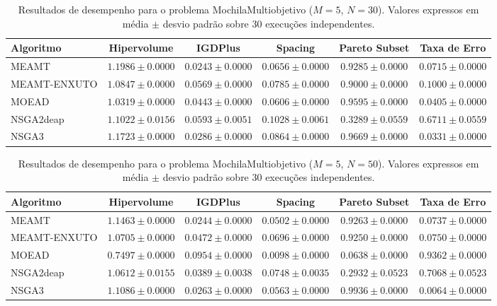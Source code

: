 \begin{table}[htpb]
\centering
\caption{Resultados de desempenho para o problema MochilaMultiobjetivo ($M=5$, $N=30$). Valores expressos em média $\pm$ desvio padrão sobre 30 execuções independentes.}
\label{tab:MochilaMultiobjetivo_M5_N30}
\begin{tabular}{lccccc}
\hline\hline
Algoritmo & Hipervolume & IGDPlus & Spacing & Pareto Subset & Taxa de Erro \\
\hline
MEAMT & $1.1986 \pm 0.0000$ & $0.0243 \pm 0.0000$ & $0.0656 \pm 0.0000$ & $0.9285 \pm 0.0000$ & $0.0715 \pm 0.0000$ \\
MEAMT-ENXUTO & $1.0847 \pm 0.0000$ & $0.0569 \pm 0.0000$ & $0.0785 \pm 0.0000$ & $0.9000 \pm 0.0000$ & $0.1000 \pm 0.0000$ \\
MOEAD & $1.0319 \pm 0.0000$ & $0.0443 \pm 0.0000$ & $0.0606 \pm 0.0000$ & $0.9595 \pm 0.0000$ & $0.0405 \pm 0.0000$ \\
NSGA2deap & $1.1022 \pm 0.0156$ & $0.0593 \pm 0.0051$ & $0.1028 \pm 0.0061$ & $0.3289 \pm 0.0559$ & $0.6711 \pm 0.0559$ \\
NSGA3 & $1.1723 \pm 0.0000$ & $0.0286 \pm 0.0000$ & $0.0864 \pm 0.0000$ & $0.9669 \pm 0.0000$ & $0.0331 \pm 0.0000$ \\
\hline\hline
\end{tabular}
\end{table}

\begin{table}[htpb]
\centering
\caption{Resultados de desempenho para o problema MochilaMultiobjetivo ($M=5$, $N=50$). Valores expressos em média $\pm$ desvio padrão sobre 30 execuções independentes.}
\label{tab:MochilaMultiobjetivo_M5_N50}
\begin{tabular}{lccccc}
\hline\hline
Algoritmo & Hipervolume & IGDPlus & Spacing & Pareto Subset & Taxa de Erro \\
\hline
MEAMT & $1.1463 \pm 0.0000$ & $0.0244 \pm 0.0000$ & $0.0502 \pm 0.0000$ & $0.9263 \pm 0.0000$ & $0.0737 \pm 0.0000$ \\
MEAMT-ENXUTO & $1.0705 \pm 0.0000$ & $0.0472 \pm 0.0000$ & $0.0696 \pm 0.0000$ & $0.9250 \pm 0.0000$ & $0.0750 \pm 0.0000$ \\
MOEAD & $0.7497 \pm 0.0000$ & $0.0954 \pm 0.0000$ & $0.0098 \pm 0.0000$ & $0.0638 \pm 0.0000$ & $0.9362 \pm 0.0000$ \\
NSGA2deap & $1.0612 \pm 0.0155$ & $0.0389 \pm 0.0038$ & $0.0748 \pm 0.0035$ & $0.2932 \pm 0.0523$ & $0.7068 \pm 0.0523$ \\
NSGA3 & $1.1086 \pm 0.0000$ & $0.0263 \pm 0.0000$ & $0.0563 \pm 0.0000$ & $0.9936 \pm 0.0000$ & $0.0064 \pm 0.0000$ \\
\hline\hline
\end{tabular}
\end{table}

